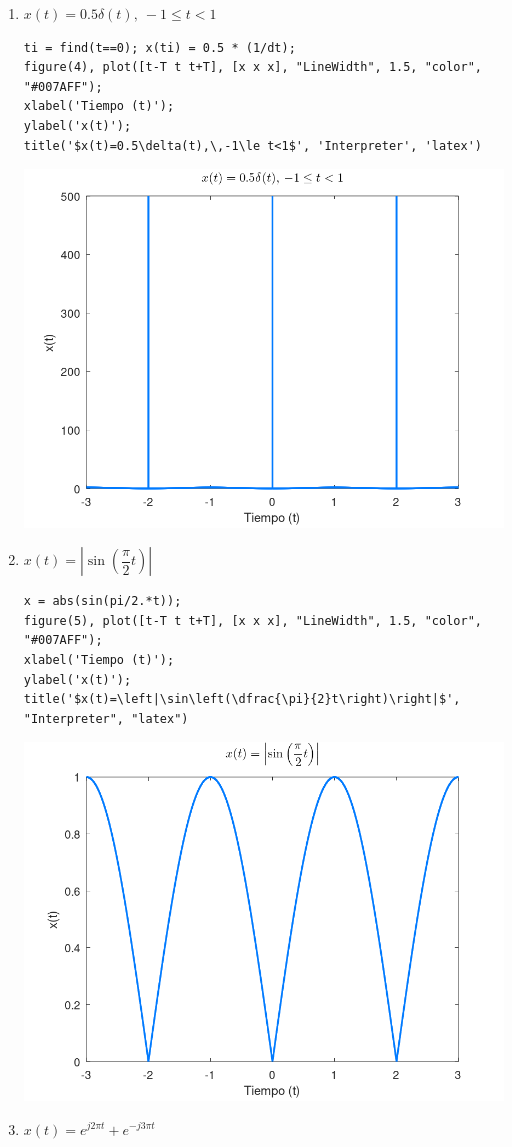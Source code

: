 \documentclass{article}
\begin{document}
\begin{enumerate}[leftmargin=*]
\begin{enumerate}[label=\alph*)]
\begin{center}
\end{center}
\item $x(t)=0.5\delta(t),\:-1\le t<1$
\begin{lstlisting}
ti = find(t==0); x(ti) = 0.5 * (1/dt);
figure(4), plot([t-T t t+T], [x x x], "LineWidth", 1.5, "color", "#007AFF");
xlabel('Tiempo (t)');
ylabel('x(t)');
title('$x(t)=0.5\delta(t),\,-1\le t<1$', 'Interpreter', 'latex')
\end{lstlisting}
\begin{center}
\includegraphics[width=0.7\linewidth]{Imágenes/Figura4}
\end{center}
\item $x(t)=\left|\sin\left(\dfrac{\pi}{2}t\right)\right|$
\begin{lstlisting}
x = abs(sin(pi/2.*t));
figure(5), plot([t-T t t+T], [x x x], "LineWidth", 1.5, "color", "#007AFF");
xlabel('Tiempo (t)');
ylabel('x(t)');
title('$x(t)=\left|\sin\left(\dfrac{\pi}{2}t\right)\right|$', "Interpreter", "latex")
\end{lstlisting}
\begin{center}
\includegraphics[width=0.7\linewidth]{Imágenes/Figura5}
\end{center}
\item $x(t)=e^{j2\pi t}+e^{-j3\pi t}$

\end{enumerate}
\end{enumerate}
\end{document}
